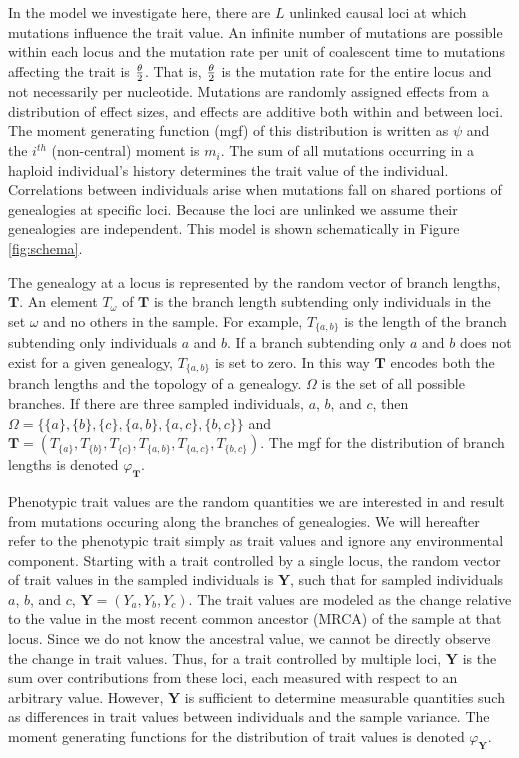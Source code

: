 In the model we investigate here, there are $L$ unlinked causal loci at which
mutations influence the trait value. An infinite number of mutations are possible
within each locus and the mutation rate per unit of coalescent time to mutations
affecting the trait is $\frac{\theta}{2}$. That is, $\frac{\theta}{2}$ is the mutation rate for the entire
locus and not necessarily per nucleotide. Mutations are randomly assigned
effects from a distribution of effect sizes, and effects are additive both
within and between loci. The moment generating function (mgf) of this
distribution is written as $\psi$ and the $i^{th}$ (non-central) moment is
$m_i$. The sum of all mutations occurring in a haploid individual's history
determines the trait value of the individual. Correlations between individuals
arise when mutations fall on shared portions of genealogies at specific loci.
Because the loci are unlinked we assume their genealogies are independent. This
model is shown schematically in Figure \ref{fig:schema}.

The genealogy at a locus is represented by the random vector of branch lengths,
$\mathbf{T}$. An element $T_{\omega}$ of $\mathbf{T}$ is the branch length
subtending only individuals in the set $\omega$ and no others in the sample. For
example, $T_{\{a,b\}}$ is the length of the branch subtending only individuals
$a$ and $b$. If a branch subtending only $a$ and $b$ does not exist for a given
genealogy, $T_{\{a,b\}}$ is set to zero. In this way $\mathbf{T}$ encodes both
the branch lengths and the topology of a genealogy. $\Omega$ is the set of all
possible branches. If there are three sampled individuals, $a$, $b$, and $c$,
then $\Omega=\{\{a\},\{b\},\{c\},\{a,b\},\{a,c\},\{b,c\}\}$ and
$\mathbf{T}=(T_{\{a\}},T_{\{b\}},T_{\{c\}},T_{\{a,b\}},T_{\{a,c\}},T_{\{b,c\}})$.
The mgf for the distribution of branch lengths is denoted $\varphi_{\mathbf{T}}$.

Phenotypic trait values are the random quantities we are interested in and
result from mutations occuring along the branches of genealogies. We will
hereafter refer to the phenotypic trait simply as trait values and ignore any
environmental component. Starting with a trait controlled by a single locus, the
random vector of trait values in the sampled individuals is $\mathbf{Y}$, such
that for sampled individuals $a$, $b$, and $c$, $\mathbf{Y}=(Y_a,Y_b,Y_c)$.
The trait values are modeled as the change relative to the value in the most
recent common ancestor (MRCA) of the sample at that locus. Since we do not know
the ancestral value, we cannot be directly observe the change in trait values.
Thus, for a trait controlled by multiple loci, $\mathbf{Y}$ is the sum over
contributions from these loci, each measured with respect to an arbitrary value.
However, $\mathbf{Y}$ is sufficient to determine measurable quantities such as
differences in trait values between individuals and the sample variance. The
moment generating functions for the distribution of trait values is denoted
$\varphi_{\mathbf{Y}}$.

